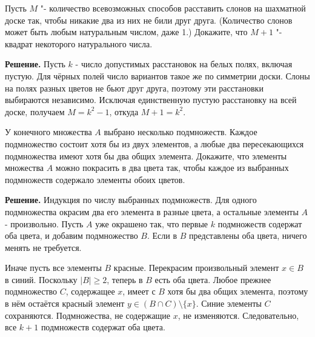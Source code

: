 \begin{problems}
\item Пусть $M$ "- количество всевозможных способов расставить слонов на шахматной доске так, чтобы никакие два из них не били друг друга. (Количество слонов может быть любым натуральным числом, даже 1.) Докажите, что $M+1$ "- квадрат некоторого натурального числа.
\par\smallskip\noindent\textbf{Решение.} Пусть $k$ - число допустимых расстановок на белых полях, включая пустую. Для чёрных полей число вариантов такое же по симметрии доски. Слоны на полях разных цветов не бьют друг друга, поэтому эти расстановки выбираются независимо. Исключая единственную пустую расстановку на всей доске, получаем $M=k^2-1$, откуда $M+1=k^2$.\par

\item У конечного множества $A$ выбрано несколько подмножеств. Каждое подмножество состоит хотя бы из двух элементов, а любые два пересекающихся подмножества имеют хотя бы два общих элемента. Докажите, что элементы множества $A$ можно покрасить в два цвета так, чтобы каждое из выбранных подмножеств содержало элементы обоих цветов.
\par\smallskip\noindent\textbf{Решение.} Индукция по числу выбранных подмножеств. Для одного подмножества окрасим два его элемента в разные цвета, а остальные элементы $A$ - произвольно. Пусть $A$ уже окрашено так, что первые $k$ подмножеств содержат оба цвета, и добавим подмножество $B$. Если в $B$ представлены оба цвета, ничего менять не требуется.
\par Иначе пусть все элементы $B$ красные. Перекрасим произвольный элемент $x\in B$ в синий. Поскольку $|B|\ge2$, теперь в $B$ есть оба цвета. Любое прежнее подмножество $C$, содержащее $x$, имеет с $B$ хотя бы два общих элемента, поэтому в нём остаётся красный элемент $y\in(B\cap C)\setminus\{x\}$. Синие элементы $C$ сохраняются. Подмножества, не содержащие $x$, не изменяются. Следовательно, все $k+1$ подмножеств содержат оба цвета.\par


\end{problems}
